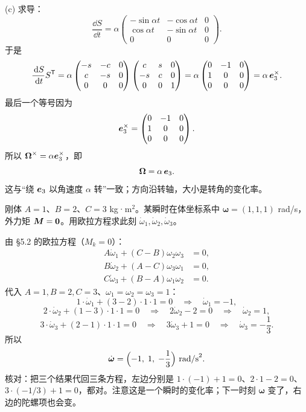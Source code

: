\documentclass[11pt]{ctexart}
\begin{document}
(c) 求导：
\[
\frac{\dd S}{\dd t}=\alpha
\begin{pmatrix}
-\sin\alpha t&-\cos\alpha t&0\\
\cos\alpha t&-\sin\alpha t&0\\
0&0&0
\end{pmatrix}.
\]
于是
\[
\frac{\,\mathrm{d} S}{\,\mathrm{d} t}S^{\mathsf T}
=\alpha
\begin{pmatrix}
-s&-c&0\\ c&-s&0\\0&0&0
\end{pmatrix}
\begin{pmatrix}
c&s&0\\-s&c&0\\0&0&1
\end{pmatrix}
=\alpha
\begin{pmatrix}
0&-1&0\\1&0&0\\0&0&0
\end{pmatrix}
=\alpha\,\boldsymbol{e}_3^{\times}.
\]
最后一个等号因为
\[
\boldsymbol{e}_3^{\times}=
\begin{pmatrix}0&-1&0\\1&0&0\\0&0&0\end{pmatrix}.
\]
所以 $\boldsymbol\Omega^{\times}=\alpha\boldsymbol{e}_3^{\times}$，即
\[
\boldsymbol\Omega=\alpha\,\boldsymbol{e}_3 .
\]
这与“绕 $\boldsymbol{e}_3$ 以角速度 $\alpha$ 转”一致；方向沿转轴，大小是转角的变化率。

{刚体 $A=1$、$B=2$、$C=3$ kg·m$^2$。某瞬时在体坐标系中 $\boldsymbol\omega=(1,1,1)$ rad/s，外力矩 $\boldsymbol{M}=\boldsymbol{0}$。用欧拉方程求此刻 $\dot\omega_1,\dot\omega_2,\dot\omega_3$。}

由 §5.2 的欧拉方程（$M_k=0$）：
\[
\begin{aligned}
A\dot\omega_1+(C-B)\omega_2\omega_3&=0,\\
B\dot\omega_2+(A-C)\omega_3\omega_1&=0,\\
C\dot\omega_3+(B-A)\omega_1\omega_2&=0 .
\end{aligned}
\]
代入 $A=1,B=2,C=3$、$\omega_1=\omega_2=\omega_3=1$：
\[
1\cdot\dot\omega_1+(3-2)\cdot1\cdot1=0 \quad\Longrightarrow\quad \dot\omega_1=-1,
\]
\[
2\cdot\dot\omega_2+(1-3)\cdot1\cdot1=0 \quad\Longrightarrow\quad 2\dot\omega_2-2=0 \quad\Longrightarrow\quad \dot\omega_2=1,
\]
\[
3\cdot\dot\omega_3+(2-1)\cdot1\cdot1=0 \quad\Longrightarrow\quad 3\dot\omega_3+1=0 \quad\Longrightarrow\quad \dot\omega_3=-\frac13 .
\]
所以
\[
\dot{\boldsymbol\omega}=\Bigl(-1,\;1,\;-\frac13\Bigr)\ \text{rad/s}^2 .
\]
核对：把三个结果代回三条方程，左边分别是 $1\cdot(-1)+1=0$、$2\cdot1-2=0$、$3\cdot(-1/3)+1=0$，都对。注意这是一个瞬时的变化率；下一时刻 $\boldsymbol\omega$ 变了，右边的陀螺项也会变。
\end{document}
